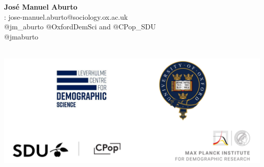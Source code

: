 \documentclass[xcolor={dvipsnames}]{beamer}
\begin{document}
\begin{frame}
 \begin{center}

			\color{black}\Large{\textbf{Jos\'{e} Manuel Aburto}}\\	
				
		\faEnvelope: jose-manuel.aburto@sociology.ox.ac.uk\\		
			\faTwitter \quad @jm\_aburto  @OxfordDemSci and @CPop\_SDU \\
			\faGithub \quad @jmaburto 
			$\,$\\
						$\,$\\
												\end{center}

\includegraphics[width=1 \textwidth,center]{Figures/logos}


 
 

\end{frame}
\end{document}
